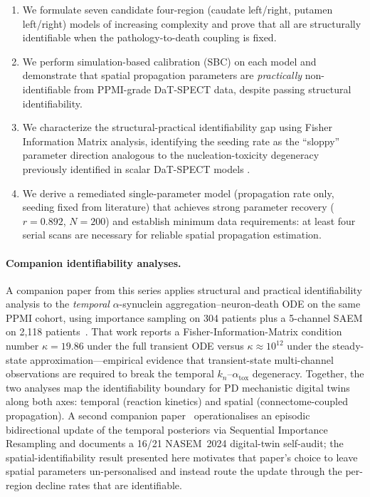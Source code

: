 \begin{enumerate}
\item We formulate seven candidate four-region (caudate left/right, putamen left/right) models of increasing complexity and prove that all are structurally identifiable when the pathology-to-death coupling is fixed.
\item We perform simulation-based calibration (SBC) \cite{talts2018} on each model and demonstrate that spatial propagation parameters are \textit{practically} non-identifiable from PPMI-grade DaT-SPECT data, despite passing structural identifiability.
\item We characterize the structural-practical identifiability gap using Fisher Information Matrix analysis, identifying the seeding rate as the ``sloppy'' parameter direction \cite{gutenkunst2007} analogous to the nucleation-toxicity degeneracy previously identified in scalar DaT-SPECT models \cite{dupre2026paper7}.
\item We derive a remediated single-parameter model (propagation rate only, seeding fixed from literature) that achieves strong parameter recovery ($r = 0.892$, $N = 200$) and establish minimum data requirements: at least four serial scans are necessary for reliable spatial propagation estimation.
\end{enumerate}

\paragraph{Companion identifiability analyses.}
A companion paper from this series applies structural and practical identifiability analysis to the \emph{temporal} $\alpha$-synuclein aggregation--neuron-death ODE on the same PPMI cohort, using importance sampling on 304 patients plus a 5-channel SAEM on 2{,}118 patients~\cite{dupre2026paper7}. That work reports a Fisher-Information-Matrix condition number $\kappa = 19.86$ under the full transient ODE versus $\kappa \approx 10^{12}$ under the steady-state approximation---empirical evidence that transient-state multi-channel observations are required to break the temporal $k_n$--$\alpha_\text{tox}$ degeneracy. Together, the two analyses map the identifiability boundary for PD mechanistic digital twins along both axes: temporal (reaction kinetics) and spatial (connectome-coupled propagation). A second companion paper~\cite{dupre2026paper10} operationalises an episodic bidirectional update of the temporal posteriors via Sequential Importance Resampling and documents a 16/21 NASEM~2024 digital-twin self-audit; the spatial-identifiability result presented here motivates that paper's choice to leave spatial parameters un-personalised and instead route the update through the per-region decline rates that are identifiable.

